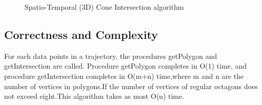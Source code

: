 \begin{figure}[tb!]
\begin{center}
{\small
\begin{minipage}{3.36in}
\myhrule \vspace{-1ex}
\vspace{-2.5ex}
\myhrule
\end{minipage}
}
\end{center}
\vspace{-3ex}
\caption{\small Spatio-Temporal (3D) Cone Intersection algorithm}
\label{alg:CI3d}
\vspace{-2ex}
\end{figure}

\subsection{Correctness and Complexity}
\textcolor[rgb]{0.00,0.07,1.00}{For each data points in a trajectory, the procedures getPolygon and getIntersection are called. Procedure getPolygon completes in O(1) time, and  procedure  getIntersection completes in O(m+n) time,where m and n are the number of vertices in polygons.If the number of vertices of regular octagons does not exceed eight.This algorithm takes as most O(n) time.
}
